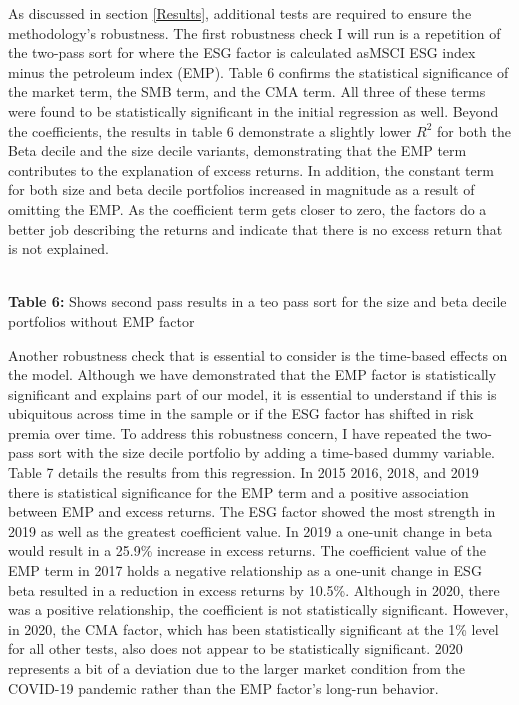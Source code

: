As discussed in section \ref{Results}, additional tests are required to ensure the methodology's robustness. The first robustness check I will run is a repetition of the two-pass sort for where the ESG factor is calculated asMSCI ESG index minus the petroleum index (EMP). Table 6 confirms the statistical significance of the market term, the SMB term, and the CMA term. All three of these terms were found to be statistically significant in the initial regression as well. Beyond the coefficients,  the results in table 6 demonstrate a slightly lower $R^2$ for both the Beta decile and the size decile variants, demonstrating that the EMP term contributes to the explanation of excess returns. In addition, the constant term for both size and beta decile portfolios increased in magnitude as a result of omitting the EMP. As the coefficient term gets closer to zero, the factors do a better job describing the returns and indicate that there is no excess return that is not explained. 
 
 \begin{center}
    \paperspacingnarrow
    \\
    \textbf{Table 6:} Shows  second pass results in a teo pass sort for the size and beta decile portfolios without EMP factor\\
    \paperspacingwide
\end{center}
Another robustness check that is essential to consider is the time-based effects on the model. Although we have demonstrated that the EMP factor is statistically significant and explains part of our model, it is essential to understand if this is ubiquitous across time in the sample or if the  ESG factor has shifted in risk premia over time. To address this robustness concern, I have repeated the two-pass sort with the size decile portfolio by adding a time-based dummy variable. Table 7 details the results from this regression. In 2015 2016, 2018, and 2019 there is statistical significance for the EMP term and a positive association between EMP and excess returns. The ESG factor showed the most strength in 2019 as well as the greatest coefficient value. In 2019 a one-unit change in beta would result in a 25.9\% increase in excess returns. The coefficient value of the EMP term in 2017  holds a negative relationship as a one-unit change in ESG beta resulted in a reduction in excess returns by 10.5\%. Although in 2020, there was a positive relationship, the coefficient is not statistically significant. However, in 2020, the CMA factor, which has been statistically significant at the 1\% level for all other tests, also does not appear to be statistically significant. 2020 represents a bit of a deviation due to the larger market condition from the COVID-19 pandemic rather than the EMP factor's long-run behavior.


